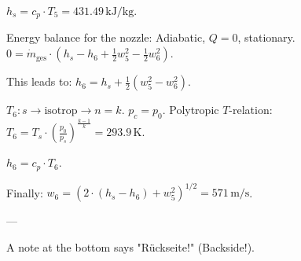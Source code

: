 \( h_s = c_p \cdot T_5 = 431.49 \, \text{kJ/kg} \).  

Energy balance for the nozzle:  
Adiabatic, \( Q = 0 \), stationary.  
\( 0 = \dot{m}_{\text{ges}} \cdot (h_s - h_6 + \frac{1}{2} w_5^2 - \frac{1}{2} w_6^2) \).  

This leads to:  
\( h_6 = h_s + \frac{1}{2} (w_5^2 - w_6^2) \).  

\( T_6: s \to \text{isotrop} \to n = k \).  
\( p_c = p_0 \).  
Polytropic \( T \)-relation:  
\( T_6 = T_s \cdot \left( \frac{p_0}{p_s} \right)^{\frac{k-1}{k}} = 293.9 \, \text{K} \).  

\( h_6 = c_p \cdot T_6 \).  

Finally:  
\( w_6 = \left( 2 \cdot (h_s - h_6) + w_5^2 \right)^{1/2} = 571 \, \text{m/s} \).  

---

A note at the bottom says "Rückseite!" (Backside!).